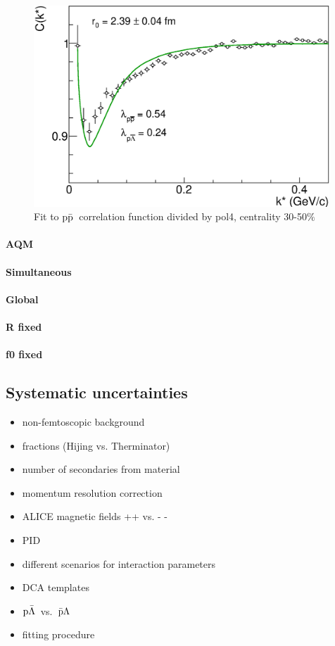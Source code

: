 \documentclass[ALICE,manyauthors]{ALICE_analysis_notes}
\newcommand{\pap}{$\rm p\bar{\rm p}$}
\newcommand{\pal}{$\rm p\bar{\rm \Lambda}$}
\newcommand{\apl}{$\bar{\rm p }\Lambda$}
\begin{document}
\begin{figure}[]
   \centering
   \includegraphics[width=0.99\textwidth]{pics/divp4NumOutPckstarPAPtpcM4Psi3_fitpap2.eps}
   \caption{Fit to \pap~correlation function divided by pol4, centrality 30-50$\%$}
   \label{fig:fitpap2}
 \end{figure}

\paragraph{AQM}

\paragraph{Simultaneous}

\paragraph{Global}

\paragraph{R fixed}

\paragraph{f0 fixed}

\subsection{Systematic uncertainties}
\begin{itemize}
\item non-femtoscopic background
\item fractions (Hijing vs. Therminator)
\item number of secondaries from material
\item momentum resolution correction
\item ALICE magnetic fields ++ vs. - - 
\item PID
\item different scenarios for interaction parameters
\item DCA templates
\item \pal~vs.~\apl
\item fitting procedure    
\end{itemize}
\end{document}
